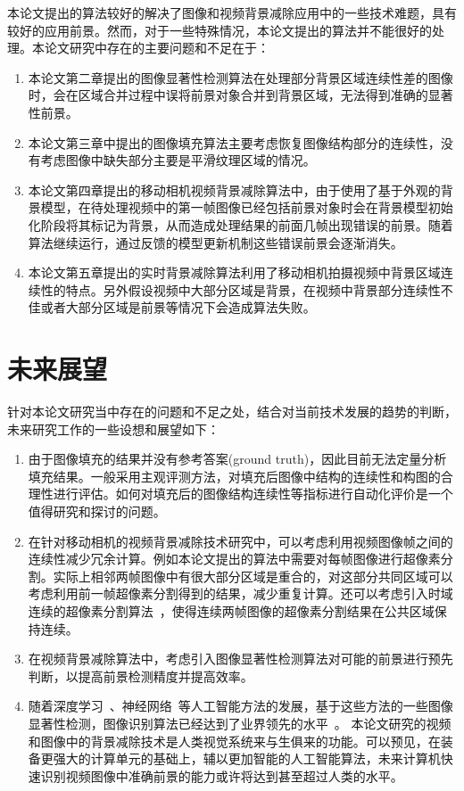 本论文提出的算法较好的解决了图像和视频背景减除应用中的一些技术难题，具有较好的应用前景。然而，对于一些特殊情况，本论文提出的算法并不能很好的处理。本论文研究中存在的主要问题和不足在于：
\begin{enumerate}
  \item 本论文第二章提出的图像显著性检测算法在处理部分背景区域连续性差的图像时，会在区域合并过程中误将前景对象合并到背景区域，无法得到准确的显著性前景。
  \item 本论文第三章中提出的图像填充算法主要考虑恢复图像结构部分的连续性，没有考虑图像中缺失部分主要是平滑纹理区域的情况。
  \item 本论文第四章提出的移动相机视频背景减除算法中，由于使用了基于外观的背景模型，在待处理视频中的第一帧图像已经包括前景对象时会在背景模型初始化阶段将其标记为背景，从而造成处理结果的前面几帧出现错误的前景。随着算法继续运行，通过反馈的模型更新机制这些错误前景会逐渐消失。

  \item 本论文第五章提出的实时背景减除算法利用了移动相机拍摄视频中背景区域连续性的特点。另外假设视频中大部分区域是背景，在视频中背景部分连续性不佳或者大部分区域是前景等情况下会造成算法失败。

\end{enumerate}
\section{未来展望}
\label{ch6:sec:futureWorks}
针对本论文研究当中存在的问题和不足之处，结合对当前技术发展的趋势的判断，未来研究工作的一些设想和展望如下：
\begin{enumerate}
  \item 由于图像填充的结果并没有参考答案(ground truth)，因此目前无法定量分析填充结果。一般采用主观评测方法，对填充后图像中结构的连续性和构图的合理性进行评估。如何对填充后的图像结构连续性等指标进行自动化评价是一个值得研究和探讨的问题。
  \item 在针对移动相机的视频背景减除技术研究中，可以考虑利用视频图像帧之间的连续性减少冗余计算。例如本论文提出的算法中需要对每帧图像进行超像素分割。实际上相邻两帧图像中有很大部分区域是重合的，对这部分共同区域可以考虑利用前一帧超像素分割得到的结果，减少重复计算。还可以考虑引入时域连续的超像素分割算法~\cite{tsp}，使得连续两帧图像的超像素分割结果在公共区域保持连续。
  \item 在视频背景减除算法中，考虑引入图像显著性检测算法对可能的前景进行预先判断，以提高前景检测精度并提高效率。

  \item 随着深度学习~\cite{DeepLearning}、神经网络~\cite{nerualNetworks}等人工智能方法的发展，基于这些方法的一些图像显著性检测，图像识别算法已经达到了业界领先的水平~\cite{NIPS2014_5547,DISC,ImageNet}。 本论文研究的视频和图像中的背景减除技术是人类视觉系统来与生俱来的功能。可以预见，在装备更强大的计算单元的基础上，辅以更加智能的人工智能算法，未来计算机快速识别视频图像中准确前景的能力或许将达到甚至超过人类的水平。
\end{enumerate}

